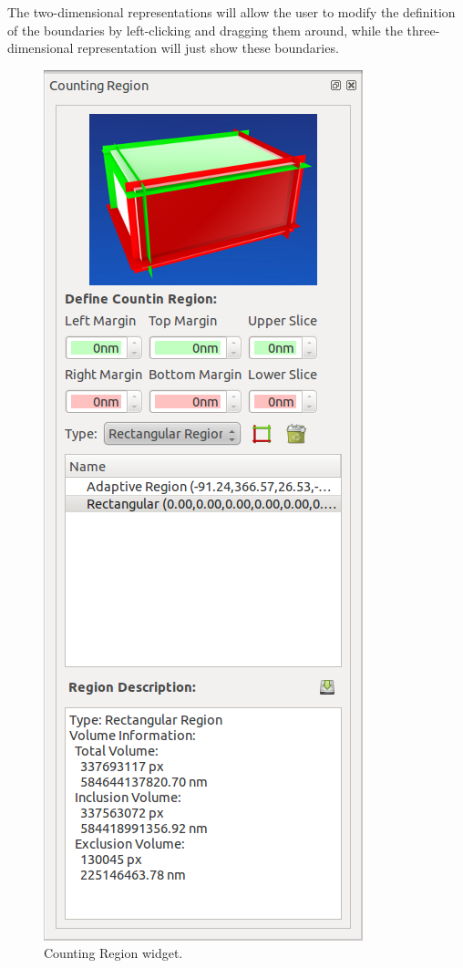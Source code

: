 The two-dimensional representations will allow the user to modify the definition of the
boundaries by left-clicking and dragging them around, while the three-dimensional
representation will just show these boundaries.\\

\begin{figure}[H]
\centering
\includegraphics[scale=0.5]{fig/plugin-ct-widget.png}
\caption{Counting Region widget.}
\end{figure}

